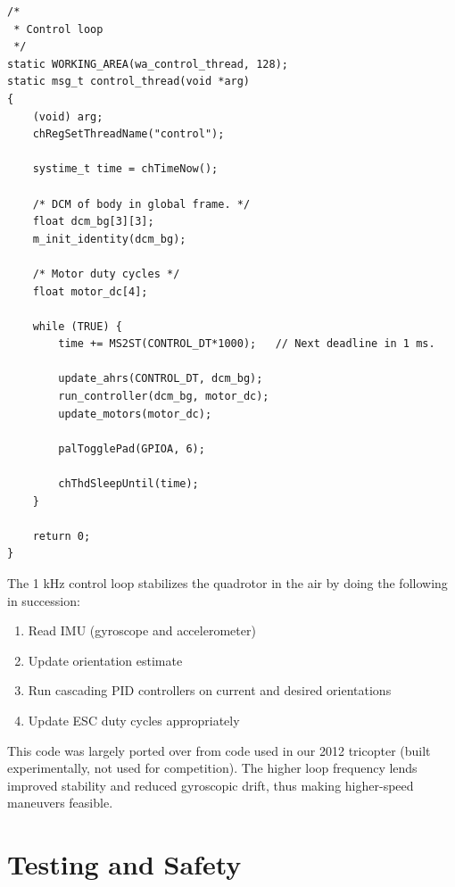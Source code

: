 \documentclass[12pt,letterpaper]{article} \usepackage[margin=1in]{geometry}
\begin{document}
\begin{center} \begin{minipage}{5.5in}

{\scriptsize

\begin{verbatim}
/*
 * Control loop
 */
static WORKING_AREA(wa_control_thread, 128);
static msg_t control_thread(void *arg)
{
    (void) arg;
    chRegSetThreadName("control");

    systime_t time = chTimeNow();

    /* DCM of body in global frame. */
    float dcm_bg[3][3];
    m_init_identity(dcm_bg);

    /* Motor duty cycles */
    float motor_dc[4];

    while (TRUE) {
        time += MS2ST(CONTROL_DT*1000);   // Next deadline in 1 ms.

        update_ahrs(CONTROL_DT, dcm_bg);
        run_controller(dcm_bg, motor_dc);
        update_motors(motor_dc);

        palTogglePad(GPIOA, 6);

        chThdSleepUntil(time);
    }

    return 0;
}
\end{verbatim}

}

\end{minipage} \end{center}

The 1 kHz control loop stabilizes the quadrotor in the air by doing the
following in succession:

\begin{enumerate}
	\item Read IMU (gyroscope and accelerometer)
	\item Update orientation estimate
	\item Run cascading PID controllers on current and desired orientations
	\item Update ESC duty cycles appropriately
\end{enumerate}

This code was largely ported over from code used in our 2012 tricopter (built
experimentally, not used for competition). The higher loop frequency lends
improved stability and reduced gyroscopic drift, thus making higher-speed
maneuvers feasible.



\section*{Testing and Safety}
\end{document}
